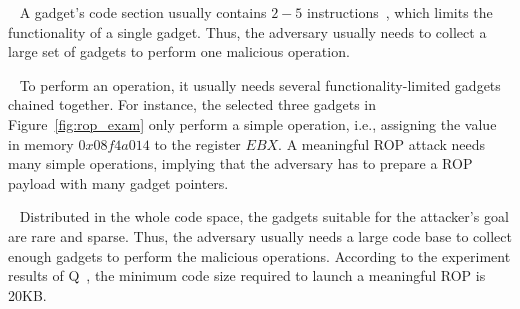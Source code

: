 ~
A gadget's code section usually contains $2-5$ instructions~\cite{tc-ret2lic}, which limits the functionality of a single gadget. Thus, the adversary usually needs to collect a large set of gadgets to perform one malicious operation.


~
To perform an operation, it usually needs several functionality-limited gadgets chained together. For instance, the selected three gadgets in Figure~\ref{fig:rop_exam} only perform a simple operation, i.e., assigning the value in memory $0x08f4a014$ to the register $EBX$. A meaningful ROP attack needs many simple operations, implying that the adversary has to prepare a ROP payload with many gadget pointers.


~
Distributed in the whole code space, the gadgets suitable for the attacker's goal are rare and sparse. Thus, the adversary usually needs a large code base to collect enough gadgets to perform the malicious operations. According to the experiment results of Q~\cite{q}, {the minimum code size required to launch a meaningful ROP is 20KB}. %



